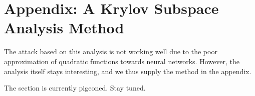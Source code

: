 \documentclass{paper}
\begin{document}
\section*{Appendix: A Krylov Subspace Analysis Method}

The attack based on this analysis is not working well due to the poor approximation of quadratic functions towards neural networks. However, the analysis itself stays interesting, and we thus supply the method in the appendix.

The section is currently pigeoned. Stay tuned.
\end{document}
